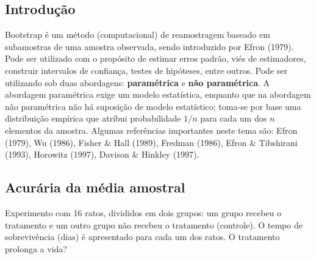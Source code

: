 \documentclass[
  letterpaper,
  DIV=11,
  numbers=noendperiod]{scrreprt}
\begin{document}
\subsection{Introdução}\label{introduuxe7uxe3o-3}

Bootstrap é um método (computacional) de reamostragem baseado em
subamostras de uma amostra observada, sendo introduzido por Efron
(1979). Pode ser utilizado com o propósito de estimar erros padrão, viés
de estimadores, construir intervalos de confiança, testes de hipóteses,
entre outros. Pode ser utilizando sob duas abordagens:
\textbf{paramétrica} e \textbf{não paramétrica}. A abordagem paramétrica
exige um modelo estatística, enquanto que na abordagem não paramétrica
não há suposição de modelo estatístico; toma-se por base uma
distribuição empírica que atribui probabilidade \(1/n\) para cada um dos
\(n\) elementos da amostra. Algumas referências importantes neste tema
são: Efron (1979), Wu (1986), Fisher \(\&\) Hall (1989), Fredman (1986),
Efron \(\&\) Tibshirani (1993), Horowitz (1997), Davison \(\&\) Hinkley
(1997).

\subsection{Acurária da média
amostral}\label{acuruxe1ria-da-muxe9dia-amostral}

Experimento com 16 ratos, divididos em dois grupos: um grupo recebeu o
tratamento e um outro grupo não recebeu o tratamento (controle). O tempo
de sobrevivência (dias) é apresentado para cada um dos ratos. O
tratamento prolonga a vida?
\end{document}
